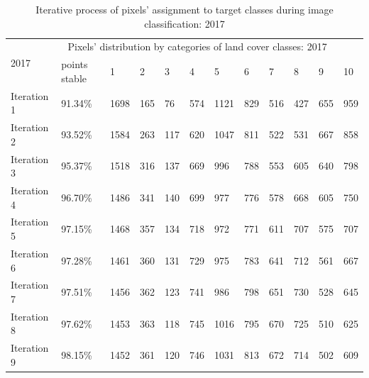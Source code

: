 \documentclass[jimaging,article,submit,pdftex,moreauthors]{Definitions/mdpi}
\begin{document}
\begin{table}[H]
  \centering
  \begin{tabularx}{\textwidth}{p{1.6cm}p{1.8cm}p{0.6cm}p{0.6cm}p{0.6cm}p{0.6cm}p{0.6cm}p{0.6cm}p{0.6cm}p{0.6cm}p{0.6cm}p{0.6cm}}
  \toprule
  \multirow{2}{*}{2017} & \multicolumn{10}{c}{Pixels' distribution by categories of land cover classes: 2017} \\
     & points stable & 1 & 2 &  3 & 4 & 5 & 6 & 7 & 8 & 9 & 10 \\
    \midrule
    Iteration 1 & 91.34\% & 1698    &    165   &      76    &    574    &   1121 &
        829    &    516    &    427   &     655     &   959 \\
    Iteration 2 & 93.52\% &  1584   &     263    &    117   &     620   &    1047&
        811   &     522   &     531    &    667     &   858 \\
    Iteration 3 & 95.37\% &  1518     &   316   &     137    &    669    &    996&
        788   &     553    &    605   &     640    &    798 \\
    Iteration 4 & 96.70\% & 1486    &    341   &     140     &   699      &  977&
        776  &      578    &    668   &     605     &   750 \\
    Iteration 5 & 97.15\% & 1468    &    357    &   134    &    718     &   972&
        771    &    611    &    707   &     575    &    707 \\
    Iteration 6 & 97.28\% & 1461   &     360  &      131  &      729    &    975&
        783   &     641     &   712    &    561     &   667 \\
    Iteration 7 & 97.51\% & 1456   &     362  &      123    &    741     &  986&
        798     &   651    &    730   &     528    &    645\\
    Iteration 8 & 97.62\% & 1453   &     363  &      118    &    745    &   1016&
        795   &     670    &    725   &     510      &  625 \\
    Iteration 9 & 98.15\% &  1452   &     361 &       120       & 746     &  1031&
        813   &     672 &     714   &     502     &   609\\
\bottomrule
\end{tabularx}
  \caption{Iterative process of pixels' assignment to target classes during image classification: 2017}
  \label{tabB2}
\end{table}
\end{document}
